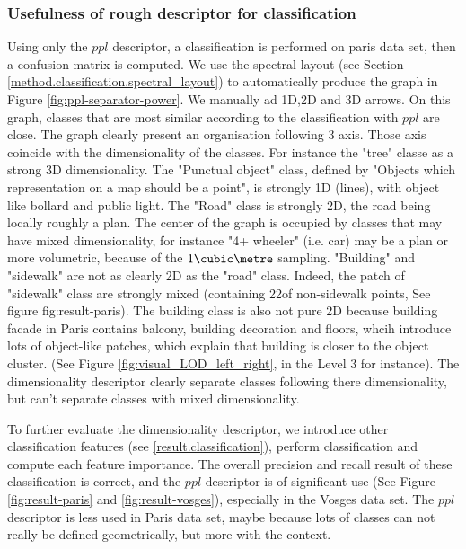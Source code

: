   
		\subsubsection{Usefulness of rough descriptor for classification}
		
		Using only the $ppl$ descriptor, a classification is performed on paris data set, then a confusion matrix is computed.
		We use the spectral layout (see Section \ref{method.classification.spectral_layout}) to automatically produce the graph in Figure \ref{fig:ppl-separator-power}. 
		We manually ad 1D,2D and 3D arrows.
		On this graph, classes that are most similar according to the classification with $ppl$ are close. The graph clearly present an organisation following 3 axis. Those axis coincide with the dimensionality of the classes. For instance the "tree" classe as a strong 3D dimensionality. The "Punctual object" class, defined by "Objects which representation on a map should be a point", is strongly 1D (lines), with object like bollard and public light. The "Road" class is strongly 2D, the road being locally roughly a plan. The center of the graph is occupied by classes that may have mixed dimensionality, for instance "4+ wheeler" (i.e. car) may be a plan or more volumetric, because of the $1 \cubic \metre$ sampling.
		"Building" and "sidewalk" are not as clearly 2D as  the "road" class. Indeed, the patch of "sidewalk" class are strongly mixed (containing 22\mypercent of non-sidewalk points, See figure fig:result-paris). The building class is also not pure 2D because building facade in Paris contains balcony, building decoration and floors, whcih introduce lots of object-like patches, which explain that building is closer to the object cluster. (See Figure \ref{fig:visual_LOD_left_right}, in the Level 3 for instance).
		The dimensionality descriptor clearly separate classes following there dimensionality, but can't separate classes with mixed dimensionality.
		
		
		To further evaluate the dimensionality descriptor, we introduce other classification features (see \ref{result.classification}), perform classification and compute each feature importance.
		The overall precision and recall result of these classification is correct, and the $ppl$ descriptor is of significant use (See Figure \ref{fig:result-paris} and \ref{fig:result-vosges}), especially in the Vosges data set. The $ppl$ descriptor is less used in Paris data set, maybe because lots of classes can not really be defined geometrically, but more with the context.
		  
